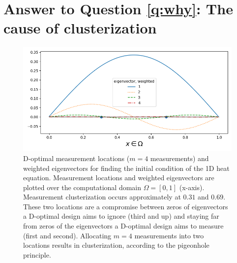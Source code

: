 \section{Answer to Question \ref{q:why}: The cause of clusterization}\label{section:why}




\begin{figure}\label{fig:eigenvectors}
    \centering
    \includegraphics[width=\textwidth]{eigenvectors_dst_scaled.png}
    \caption{D-optimal measurement locations ($m=4$ measurements) and
      weighted eigenvectors for finding the initial condition of
      the 1D heat equation. Measurement locations and weighted
      eigenvectors are plotted over the computational domain $\Omega =
      [0, 1]$ (x-axis). Measurement clusterization occurs
      approximately at $0.31$ and $0.69$. These two locations are a
      compromise between zeros of eigenvectors a D-optimal design aims
      to ignore (third and up) and staying far from zeros of the
      eigenvectors a D-optimal design aims to measure (first and
      second). Allocating $m=4$ measurements into two locations
      results in clusterization, according to the pigeonhole
      principle.}
  \label{fig:why}
\end{figure}





